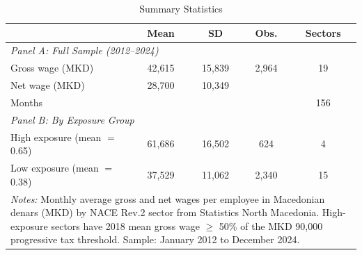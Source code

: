 \begin{table}[htbp]
\centering
\caption{Summary Statistics}
\label{tab:summary}
\begin{tabular}{lcccc}
\hline\hline
 & Mean & SD & Obs. & Sectors \\
\hline
\multicolumn{5}{l}{\textit{Panel A: Full Sample (2012--2024)}} \\
Gross wage (MKD) & 42,615 & 15,839 & 2,964 & 19 \\
Net wage (MKD) & 28,700 & 10,349 & & \\
Months & & & & 156 \\
\hline
\multicolumn{5}{l}{\textit{Panel B: By Exposure Group}} \\
High exposure (mean $=$ 0.65) & 61,686 & 16,502 & 624 & 4 \\
Low exposure (mean $=$ 0.38) & 37,529 & 11,062 & 2,340 & 15 \\
\hline\hline
\multicolumn{5}{p{0.85\textwidth}}{\footnotesize \textit{Notes:} Monthly average gross and net wages per employee in Macedonian denars (MKD) by NACE Rev.2 sector from Statistics North Macedonia. High-exposure sectors have 2018 mean gross wage $\geq$ 50\% of the MKD 90,000 progressive tax threshold. Sample: January 2012 to December 2024.}
\end{tabular}
\end{table}

